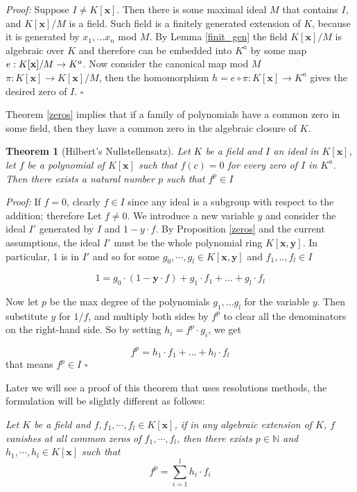 \documentclass[a4paper,12pt,oneside]{book}
\newtheorem{theorem}{Theorem}[chapter]
\newcommand*{\QED}{\hfill\ensuremath{\square}}
\begin{document}
\textit{Proof:}
Suppose $I\neq K[\mathbf{x}]$. Then there is some maximal ideal $M$ that contains $I$, and $K[\mathbf{x}]/M$ is a field. Such field is a finitely generated extension of $K$, because it is generated by $x_1, ... x_n$ mod $M$. By Lemma \ref{finit_gen} the field $K[\mathbf{x}]/M$ is algebraic over $K$ and therefore can be embedded into $K^a$ by some map $e:K[\mathbf{x}]/M \rightarrow\nobreak K^a$. Now consider the canonical map mod $M$  $\pi : K[\mathbf{x}] \rightarrow K[\mathbf{x}]/M$, then the homomorphism $h=e\circ\pi : K[\mathbf{x}]\rightarrow K^a$ gives the desired zero of $I$. \QED

Theorem \ref{zeros} implies that if a family of polynomials have a common zero in some field, then they have a common zero in the algebraic closure of $K$. 

\begin{theorem}[Hilbert's Nullstellensatz]\label{langsnulls}
Let $K$ be a field and $I$ an ideal in $K[\mathbf{x}]$, let $f$ be a polynomial of $K[\mathbf{x}]$ such that $f(c)=0$ for every zero of $I$ in $K^a$. Then there exists a natural number $p$ such that $f^p\in I$
\end{theorem}

\textit{Proof:} If $f=0$, clearly $f\in I$ since any ideal is a subgroup with respect to the addition; therefore  Let $f\neq 0$. We introduce a new variable $y$ and consider the ideal $I'$ generated by $I$ and $1-y\cdot f$. By Proposition \ref{zeros} and the current assumptions, the ideal $I'$ must be the whole polynomial ring $K[\mathbf{x},\mathbf{y}]$. In particular, 1 is in $I'$ and so for some $g_0,\cdots,g_l\in K[\mathbf{x},\mathbf{y}]$ and $f_1,..,f_l\in I$

$$ 1= g_0 \cdot (1-\mathbf{y}\cdot f) + g_1\cdot f_1 + ...+ g_l\cdot f_l  $$ 

\noindent Now let $p$ be the max degree of the polynomials $g_1,...g_l$ for the variable $y$. Then
substitute $y$ for $1/f$, and multiply both sides by  $f^p$ to clear all the denominators on the right-hand side. So by setting $h_i= f^p \cdot g_i$, we get

$$ f^p= h_1\cdot f_1 + ...+ h_l\cdot f_l   $$
that means $f^p\in I$  \QED

\noindent Later we will see a proof of this theorem that uses resolutions methods, the formulation will be slightly different as follows:

\noindent\textit{Let $K$ be a field and $f,f_1,\cdots, f_l \in K[\mathbf{x}]$, if in any algebraic extension of $K$, $f$ vanishes at all common zeros of $f_1,\cdots, f_l$, then there exists $p\in \mathbb{N}$ and $h_1,\cdots, h_l \in K[\mathbf{x}]$ such that} 
$$
f^p = \sum_{i=1}^l h_i \cdot f_i
$$
\end{document}
